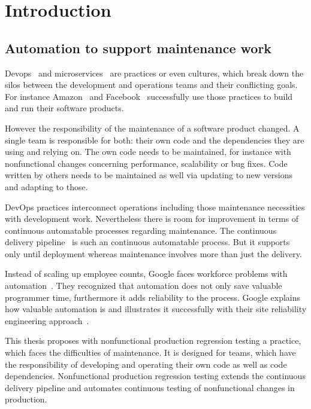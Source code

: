 \chapter{Introduction}
\section{Automation to support maintenance work}

Devops~\cite{devops_definition} and microservices~\cite{microservices_fowler} are
practices or even cultures, which break down the silos between the development and
operations teams and their conflicting goals. For instance Amazon~\cite{build_run} and
Facebook~\cite{dev_at_fb} successfully use those practices to build and run their software
products.

However the responsibility of the maintenance of a software product changed. A single team
is responsible for both: their own code and the dependencies they are using and relying
on. The own code needs to be maintained, for instance with nonfunctional changes
concerning performance, scalability or bug fixes. Code written by others needs to be
maintained as well via updating to new versions and adapting to those.

DevOps practices interconnect operations including those maintenance necessities with
development work. Nevertheless there is room for improvement in terms of continuous
automatable processes regarding maintenance. The continuous delivery
pipeline~\cite{cd_humble_pipeline} is such an continuous automatable process. But it
supports only until deployment whereas maintenance involves more than just the delivery.

Instead of scaling up employee counts, Google faces workforce problems with
automation~\cite{sre_automation}. They recognized that automation does not only save
valuable programmer time, furthermore it adds reliability to the process. Google explains
how valuable automation is and illustrates it successfully with their site reliability
engineering approach~\cite{sre_intro}.

This thesis proposes with nonfunctional production regression testing a practice, which
faces the difficulties of maintenance. It is designed for teams, which have the
responsibility of developing and operating their own code as well as code
dependencies. Nonfunctional production regression testing extends the continuous delivery
pipeline and automates continuous testing of nonfunctional changes in production.

